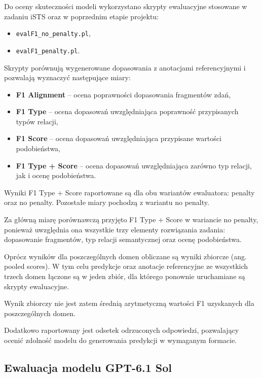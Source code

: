 \documentclass[a4paper,10pt]{article}
\begin{document}
Do oceny skuteczności modeli wykorzystano skrypty
ewaluacyjne stosowane w zadaniu iSTS oraz
w poprzednim etapie projektu:

\begin{itemize}
    \item \texttt{evalF1\_no\_penalty.pl},
    \item \texttt{evalF1\_penalty.pl}.
\end{itemize}

Skrypty porównują wygenerowane dopasowania z anotacjami
referencyjnymi i pozwalają wyznaczyć następujące miary:

\begin{itemize}
    \item \textbf{F1 Alignment} -- ocena poprawności
    dopasowania fragmentów zdań,

    \item \textbf{F1 Type} -- ocena dopasowań
    uwzględniająca poprawność przypisanych typów relacji,

    \item \textbf{F1 Score} -- ocena dopasowań
    uwzględniająca przypisane wartości podobieństwa,

    \item \textbf{F1 Type + Score} -- ocena dopasowań
    uwzględniająca zarówno typ relacji, jak i ocenę
    podobieństwa.
\end{itemize}

Wyniki F1 Type + Score raportowane są dla obu
wariantów ewaluatora: penalty oraz no penalty.
Pozostałe miary pochodzą z wariantu no penalty.

Za główną miarę porównawczą przyjęto F1 Type + Score
w wariancie no penalty, ponieważ uwzględnia ona
wszystkie trzy elementy rozwiązania zadania:
dopasowanie fragmentów, typ relacji semantycznej
oraz ocenę podobieństwa.

Oprócz wyników dla poszczególnych domen obliczane są
wyniki zbiorcze (ang. pooled scores). W tym celu
predykcje oraz anotacje referencyjne ze wszystkich
trzech domen łączone są w jeden zbiór, dla którego
ponownie uruchamiane są skrypty ewaluacyjne.

Wynik zbiorczy nie jest zatem średnią arytmetyczną
wartości F1 uzyskanych dla poszczególnych domen.

Dodatkowo raportowany jest odsetek odrzuconych
odpowiedzi, pozwalający ocenić zdolność modelu
do generowania predykcji w wymaganym formacie.


\subsection{Ewaluacja modelu GPT-6.1 Sol}
\end{document}

